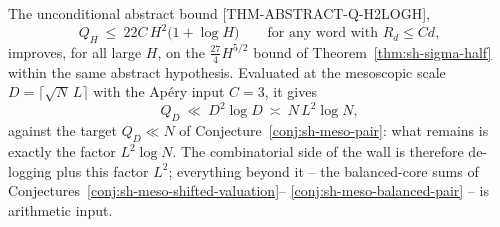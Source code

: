 \begin{remark}
\label{rem:sh-meso-h2logh}
The unconditional abstract bound [THM-ABSTRACT-Q-H2LOGH],
\[
 Q_H\ \le\ 22C\,H^2\bigl(1+\log H\bigr)
 \qquad\text{for any word with }R_d\le Cd,
\]
improves, for all large $H$, on the $\tfrac{27}4H^{5/2}$ bound of
Theorem~\ref{thm:sh-sigma-half} within the same abstract hypothesis.
Evaluated at the mesoscopic scale $D=\lceil\sqrt N\,L\rceil$ with the
Ap\'ery input $C=3$, it gives
\[
 Q_D\ \ll\ D^2\log D\ \asymp\ N\,L^2\log N,
\]
against the target $Q_D\ll N$ of
Conjecture~\ref{conj:sh-meso-pair}: what remains is exactly the
factor $L^2\log N$.  The combinatorial side of the wall is therefore
de-logging plus this factor $L^2$; everything beyond it -- the
balanced-core sums of
Conjectures~\ref{conj:sh-meso-shifted-valuation}--%
\ref{conj:sh-meso-balanced-pair} -- is arithmetic input.
\end{remark}
